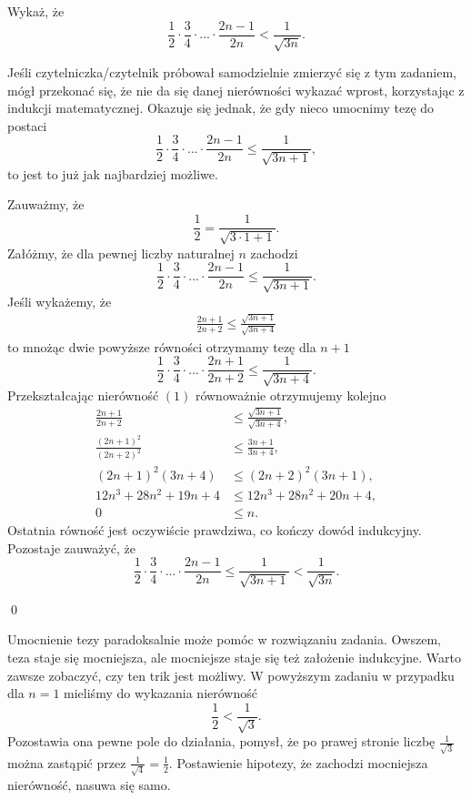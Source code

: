 \vspace{10px}


\noindent
Wykaż, że
\[
	\frac{1}{2} \cdot \frac{3}{4} \cdot ... \cdot \frac{2n - 1}{2n} < \frac{1}{\sqrt{3n}}.
\]

\newpage


\noindent
Jeśli czytelniczka/czytelnik próbował samodzielnie zmierzyć się z tym zadaniem, mógł przekonać się, że nie da się danej nierówności wykazać wprost, korzystając z indukcji matematycznej. Okazuje się jednak, że gdy nieco umocnimy tezę do postaci
\[
	\frac{1}{2} \cdot \frac{3}{4} \cdot ... \cdot \frac{2n - 1}{2n} \leqslant \frac{1}{\sqrt{3n + 1}},
\]
to jest to już jak najbardziej możliwe.

\vspace{10px}
\noindent
Zauważmy, że
\[
	\frac{1}{2} = \frac{1}{\sqrt{3\cdot 1 + 1}}.
\]
Załóżmy, że dla pewnej liczby naturalnej $n$ zachodzi 
\[
	\frac{1}{2} \cdot \frac{3}{4} \cdot ... \cdot \frac{2n - 1}{2n} \leqslant \frac{1}{\sqrt{3n + 1}}.
\]
Jeśli wykażemy, że 
\begin{gather}
	\frac{2n + 1}{2n + 2} \leqslant \frac{\sqrt{3n + 1}}{\sqrt{3n + 4}}
\end{gather}
to mnożąc dwie powyższe równości otrzymamy tezę dla $n + 1$
\[
	\frac{1}{2} \cdot \frac{3}{4} \cdot ... \cdot \frac{2n + 1}{2n + 2} \leqslant \frac{1}{\sqrt{3n + 4}}.
\]
Przekształcając nierówność $(1)$ równoważnie otrzymujemy kolejno
\begin{align*}	
	\frac{2n + 1}{2n + 2} &\leqslant \frac{\sqrt{3n + 1}}{\sqrt{3n + 4}},\\
	\frac{(2n + 1)^2}{(2n + 2)^2} &\leqslant \frac{3n + 1}{3n + 4},\\
	(2n + 1)^2(3n + 4) &\leqslant (2n + 2)^2(3n + 1), \\
	12n^3 + 28n^2 + 19n + 4 &\leqslant  12n^3 + 28n^2 + 20n + 4, \\
	0 &\leqslant n.
\end{align*}
Ostatnia równość jest oczywiście prawdziwa, co kończy dowód indukcyjny. Pozostaje zauważyć, że
\[
	\frac{1}{2} \cdot \frac{3}{4} \cdot ... \cdot \frac{2n - 1}{2n} \leqslant \frac{1}{\sqrt{3n + 1}} < \frac{1}{\sqrt{3n}}.
\]

\qed

\noindent
Umocnienie tezy paradoksalnie może pomóc w rozwiązaniu zadania. Owszem, teza staje się mocniejsza, ale mocniejsze staje się też założenie indukcyjne. Warto zawsze zobaczyć, czy ten trik jest możliwy. W powyższym zadaniu w przypadku dla $n = 1$ mieliśmy do wykazania nierówność
\[
	\frac{1}{2} < \frac{1}{\sqrt{3}}.
\]
Pozostawia ona pewne pole do działania, pomysł, że po prawej stronie liczbę $\frac{1}{\sqrt{3}}$ można zastąpić przez $\frac{1}{\sqrt{4}} = \frac{1}{2}$. Postawienie hipotezy, że zachodzi mocniejsza nierówność, nasuwa się samo. 

